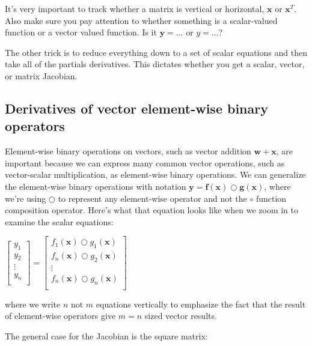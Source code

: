 \documentclass[11pt]{article}
\begin{document}
It's very important to track whether a matrix is vertical or horizontal, $\mathbf{x}$ or $\mathbf{x}^T$. Also make sure you pay attention to whether something is a scalar-valued function or a vector valued function. Is it $\mathbf{y} = \ldots$ or $y = \ldots$?

The other trick is to reduce everything down to a set of scalar equations and then take all of the partials derivatives. This dictates whether you get a scalar, vector, or matrix Jacobian.

\subsection{Derivatives of vector element-wise binary operators}

Element-wise binary operations on vectors, such as vector addition $\mathbf{w} + \mathbf{x}$, are important because we can express many common vector operations, such as vector-scalar multiplication, as element-wise binary operations.  We can generalize the element-wise binary operations with notation $\mathbf{y} = \mathbf{f(x)} \bigcirc \mathbf{g(x)}$, where we're using $\bigcirc$ to represent any element-wise operator and not the $\circ$ function composition operator.  Here's what that equation looks like when we zoom in to examine the scalar equations:

$\begin{bmatrix}
           y_1\\
           y_2\\
           \vdots \\
           y_n\\
           \end{bmatrix} = \begin{bmatrix}
           f_{1}(\mathbf{x}) \bigcirc g_{1}(\mathbf{x})\\
           f_{n}(\mathbf{x}) \bigcirc g_{2}(\mathbf{x})\\
           \vdots \\
           f_{n}(\mathbf{x}) \bigcirc g_{n}(\mathbf{x})\\
         \end{bmatrix}$

where we write $n$ not $m$ equations vertically to emphasize the fact that the result of element-wise operators give $m=n$ sized vector results.

The general case for the Jacobian is the square matrix:
\end{document}
